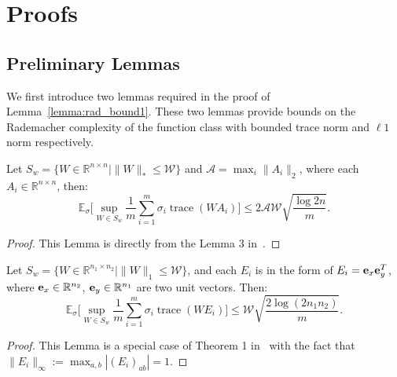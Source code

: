 \documentclass[twoside,11pt]{article}
\def\be{{\bf e}}
\def\R{\mathbb{R}}
\newcommand\Ex[2]{{\mathbb E}_{#1}\big[#2\big]}
\newcommand\trace[1]{{\operatorname{trace}}(#1)}
\def\amax{{\mathcal A}}
\def\wmax{{\mathcal W}}
\begin{document}


\appendix
\section{Proofs}
\subsection*{Preliminary Lemmas}
We first introduce two lemmas required in the proof of Lemma~\ref{lemma:rad_bound1}.
These two lemmas provide bounds on the Rademacher complexity of the function
class with bounded trace norm and $\ell1$ norm respectively.
\begin{lemma}
  \label{lemma:rad_bound_nuclear}
  Let $S_w = \{W \in \R^{n\times n}\mid \|W\|_* \leq \wmax\}$ and
  $\amax = \max_i \|A_i\|_2$, where each $A_i \in \R^{n\times n}$,
  then:
  \begin{equation*}
    \Ex{\sigma}{\sup_{W\in S_w}\frac{1}{m} \sum_{i=1}^m \sigma_i \trace{WA_i}}
    \leq 2\amax\wmax\sqrt{\frac{\log{2n}}{m}}.
  \end{equation*}
\end{lemma}
\begin{proof}
  This Lemma is directly from the Lemma 3 in~\citet{Hsieh15a}.
\end{proof}

\begin{lemma}
  \label{lemma:rad_bound_sparse}
  Let $S_w = \{W \in \R^{n_1\times n_2}\mid \|W\|_1 \leq \wmax\}$, and each $E_i$
  is in the form of $E_i = \be_x \be_y^T$,
  where $\be_x \in \R^{n_2}$, $\be_y \in \R^{n_1}$ are two unit vectors.  Then:
  \begin{equation*}
    \Ex{\sigma}{\sup_{W \in S_w} \frac{1}{m}\sum_{i=1}^m
    \sigma_{i}\trace{W E_i}}
    \leq \wmax \sqrt{\frac{2\log{(2n_1n_2)}}{m}}.
  \end{equation*}
\end{lemma}
\begin{proof}
This Lemma is a special case of Theorem 1 in~\citet{SK08a} with the fact that
$\|E_i\|_\infty := \max_{a,b}|(E_i)_{ab}|= 1$.
\end{proof}
\end{document}
